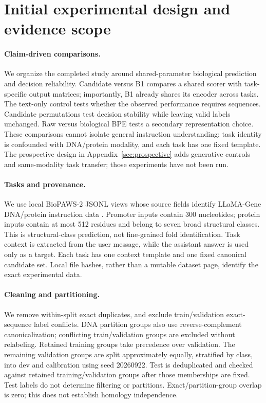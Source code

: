 \section{Initial experimental design and evidence scope}
\paragraph{Claim-driven comparisons.}
We organize the completed study around shared-parameter biological prediction and decision reliability. Candidate versus B1 compares a shared scorer with task-specific output matrices; importantly, B1 already shares its encoder across tasks. The text-only control tests whether the observed performance requires sequences. Candidate permutations test decision stability while leaving valid labels unchanged. Raw versus biological BPE tests a secondary representation choice. These comparisons cannot isolate general instruction understanding: task identity is confounded with DNA/protein modality, and each task has one fixed template. The prospective design in Appendix~\ref{sec:prospective} adds generative controls and same-modality task transfer; those experiments have not been run.

\begin{table}[t]
\centering\small

\caption{Common eligible examples after data cleaning and the inherited complete-input filter. Dev is used for diagnostics; calibration is used only for temperature fitting.}
\label{tab:data}
\end{table}
\paragraph{Tasks and provenance.}
We use local BioPAWS-2 JSONL views \citep{wang2026biopaws} whose source fields identify LLaMA-Gene DNA/protein instruction data \citep{wang2024llamagene}. Promoter inputs contain 300 nucleotides; protein inputs contain at most 512 residues and belong to seven broad structural classes. This is structural-class prediction, not fine-grained fold identification. Task context is extracted from the user message, while the assistant answer is used only as a target. Each task has one context template and one fixed canonical candidate set. Local file hashes, rather than a mutable dataset page, identify the exact experimental data.

\paragraph{Cleaning and partitioning.}
We remove within-split exact duplicates, and exclude train/validation exact-sequence label conflicts. DNA partition groups also use reverse-complement canonicalization; conflicting train/validation groups are excluded without relabeling. Retained training groups take precedence over validation. The remaining validation groups are split approximately equally, stratified by class, into dev and calibration using seed 20260922. Test is deduplicated and checked against retained training/validation groups after those memberships are fixed. Test labels do not determine filtering or partitions. Exact/partition-group overlap is zero; this does not establish homology independence.

